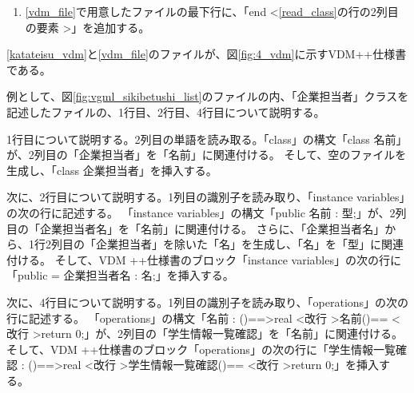 \begin{enumerate}
\begin{enumerate}
\begin{enumerate}
                \end{enumerate}
            \item \ref{shikibetu_elem}の行の1列目の識別子が「operations」である場合、\ref{add_sikibetushi}で追加した「operations」の次の行に、表{}の構文に従って、\ref{shikibetu_elem}の行の2列目の要素をVDM++仕様書の構文の「名前」に挿入する。
        \end{enumerate}
    \item \ref{vdm_file}で用意したファイルの最下行に、「end \textless \ref{read_class}の行の2列目の要素 \textgreater」を追加する。
\end{enumerate}

\ref{katateisu_vdm}と\ref{vdm_file}のファイルが、図\ref{fig:4_vdm}に示すVDM++仕様書である。

例として、図\ref{fig:vgml_sikibetushi_list}のファイルの内、「企業担当者」クラスを記述したファイルの、1行目、2行目、4行目について説明する。

1行目について説明する。2列目の単語を読み取る。「class」の構文「class 名前」が、2列目の「企業担当者」を「名前」に関連付ける。
そして、空のファイルを生成し、「class 企業担当者」を挿入する。

次に、2行目について説明する。1列目の識別子を読み取り、「instance variables」の次の行に記述する。
「instance variables」の構文「public 名前 : 型;」が、2列目の「企業担当者名」を「名前」に関連付ける。
さらに、「企業担当者名」から、1行2列目の「企業担当者」を除いた「名」を生成し、「名」を「型」に関連付ける。
そして、VDM ++仕様書のブロック「instance variables」の次の行に「public  = 企業担当者名 : 名;」を挿入する。

次に、4行目について説明する。1列目の識別子を読み取り、「operations」の次の行に記述する。
「operations」の構文「名前 : ()==\textgreater real \textless 改行 \textgreater 名前()== \textless 改行 \textgreater return 0;」が、2列目の「学生情報一覧確認」を「名前」に関連付ける。
そして、VDM ++仕様書のブロック「operations」の次の行に「学生情報一覧確認 : ()==\textgreater real \textless 改行 \textgreater 学生情報一覧確認()== \textless 改行 \textgreater return 0;」を挿入する。
